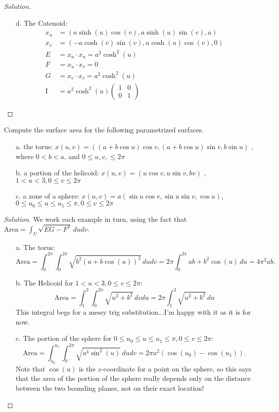 \documentclass[Shifrin_Solutions_Spring_2018]{subfiles}
\begin{document}
\begin{proof}[Solution]
\begin{itemize}
\item[d.] The Catenoid:
\begin{align*}
x_u & = \left( a\sinh(u)\cos(v), a\sinh(u)\sin(v), a \right) \\
x_v & = \left( -a\cosh(v)\sin(v), a\cosh(u)\cos(v), 0\right) \\
E & = x_u\cdot x_u = a^2 \cosh^2(u) \\
F & = x_u\cdot x_v = 0 \\
G & = x_v\cdot x_v =  a^2 \cosh^2(u)  \\
\mathrm{I} &= a^2 \cosh^2(u)  \begin{pmatrix} 1 & 0 \\ 0 &  1 \end{pmatrix}
\end{align*}
\end{itemize}
\end{proof}

\begin{exercise}
Compute the surface area for the following parametrized surfaces.
\begin{itemize}
\item[a.] the torus: $x(u,v) = ( (a+b\cos u) \cos v , (a + b \cos u) \sin v , b \sin u )$ , where $0<b < a$, and  $ 0 \leq u, v, \leq 2\pi$
\item[b.] a portion of the helicoid:  $x(u,v) = (u \cos v , u \sin v, bv )$ , $1< u < 3, 0\leq v \leq 2\pi$
\item[c.] a zone of a sphere: $x(u,v) = a (\sin u \cos v , \sin u \sin v , \cos u )$, $0\leq u_0 \leq u \leq u_1 \leq \pi, 0 \leq v \leq 2\pi$
\end{itemize}
\end{exercise}

\begin{proof}[Solution] We work each example in turn, using the fact that $\mathrm{Area} = \int_U \sqrt{EG-F^2}\, dudv$.
\begin{itemize}
\item[a.] The torus:
\[
\mathrm{Area} = \int_0^{2\pi}\int_0^{2\pi} \sqrt{b^2(a+b\cos(u))^2} \, dudv =2\pi \int_0^{2\pi} ab + b^2\cos(u) \, du = 4\pi^2 a b.
\]
\item[b.] The Helicoid for $1<u<3, 0\leq v \leq 2\pi$:
\[
\mathrm{Area} = \int_1^3\int_0^{2\pi}\sqrt{u^2+b^2} \, dvdu = 2\pi \int_1^3 \sqrt{u^2+b^2} \, du
\]
This integral begs for a messy trig substitution...I'm happy with it as it is for now.

\item[c.] The portion of the sphere for $0\leq u_0 \leq u \leq u_1 \leq \pi, 0 \leq v \leq 2\pi$:
\[
\mathrm{Area} = \int_{u_0}^{u_1} \int_0^{2\pi} \sqrt{a^4\sin^2(u)}\, dudv = 2\pi a^2 \left( \cos(u_0) - \cos(u_1) \right).
\]
Note that $\cos(u)$ is the $z$-coordinate for a point on the sphere, so this says that the area of the portion of the sphere really depends only on the distance between the two bounding planes, not on their exact location!
\end{itemize}
\end{proof}
\end{document}
